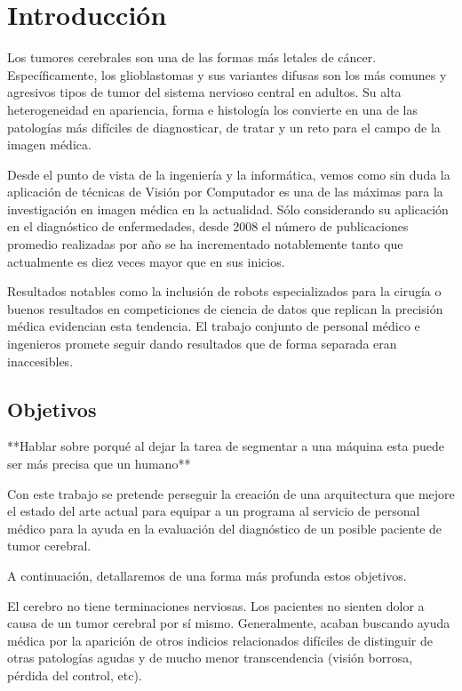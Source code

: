 \chapter{Introducción}

Los tumores cerebrales son una de las formas más letales de cáncer. Específicamente, los glioblastomas y sus variantes difusas son los más comunes y agresivos tipos de tumor del sistema nervioso central en adultos. Su alta heterogeneidad en apariencia, forma e histología los convierte en una de las patologías más difíciles de diagnosticar, de tratar y un reto para el campo de la imagen médica.

Desde el punto de vista de la ingeniería y la informática, vemos como sin duda la aplicación de técnicas de Visión por Computador es una de las máximas para la investigación en imagen médica en la actualidad. Sólo considerando su aplicación en el diagnóstico de enfermedades, desde 2008 el número de publicaciones promedio realizadas por año se ha incrementado notablemente tanto que actualmente es diez veces mayor que en sus inicios. 

Resultados notables como la inclusión de robots especializados para la cirugía \cite{DAVINCI} o buenos resultados en competiciones de ciencia de datos que replican la precisión médica \cite{PANDA} evidencian esta tendencia. El trabajo conjunto de personal médico e ingenieros promete seguir dando resultados que de forma separada eran inaccesibles.



\section{Objetivos}

**Hablar sobre porqué al dejar la tarea de segmentar a una máquina esta puede ser más precisa que un humano**

Con este trabajo se pretende perseguir la creación de una arquitectura que mejore el estado del arte actual para equipar a un programa al servicio de personal médico para la ayuda en la evaluación del diagnóstico de un posible paciente de tumor cerebral.

A continuación, detallaremos de una forma más profunda estos objetivos.

El cerebro no tiene terminaciones nerviosas. Los pacientes no sienten dolor a causa de un tumor cerebral por sí mismo. Generalmente, acaban buscando ayuda médica por la aparición de otros indicios relacionados difíciles de distinguir de otras patologías agudas y de mucho menor transcendencia (visión borrosa, pérdida del control, etc).

